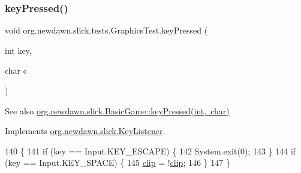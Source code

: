 \mbox{\label{classorg_1_1newdawn_1_1slick_1_1tests_1_1_graphics_test_a36789cd962301ed1cef2b20092396cfa}} 
\subsubsection{\texorpdfstring{key\+Pressed()}{keyPressed()}}
{\footnotesize\ttfamily void org.\+newdawn.\+slick.\+tests.\+Graphics\+Test.\+key\+Pressed (\begin{DoxyParamCaption}\item[{int}]{key,  }\item[{char}]{c }\end{DoxyParamCaption})\hspace{0.3cm}{\ttfamily [inline]}}

\begin{DoxySeeAlso}{See also}
\mbox{\hyperlink{classorg_1_1newdawn_1_1slick_1_1_basic_game_a4fbb3345b5abf5ddd54a99466d07f02f}{org.\+newdawn.\+slick.\+Basic\+Game\+::key\+Pressed(int, char)}} 
\end{DoxySeeAlso}


Implements \mbox{\hyperlink{interfaceorg_1_1newdawn_1_1slick_1_1_key_listener_ac0b0568a21ef486c4f51382614c196ef}{org.\+newdawn.\+slick.\+Key\+Listener}}.


\begin{DoxyCode}
140                                             \{
141         \textcolor{keywordflow}{if} (key == Input.KEY\_ESCAPE) \{
142             System.exit(0);
143         \}
144         \textcolor{keywordflow}{if} (key == Input.KEY\_SPACE) \{
145             \mbox{\hyperlink{classorg_1_1newdawn_1_1slick_1_1tests_1_1_graphics_test_a45883b25988c6ce31f644d342ab168f3}{clip}} = !\mbox{\hyperlink{classorg_1_1newdawn_1_1slick_1_1tests_1_1_graphics_test_a45883b25988c6ce31f644d342ab168f3}{clip}};
146         \}
147     \}
\end{DoxyCode}
\mbox{\label{classorg_1_1newdawn_1_1slick_1_1tests_1_1_graphics_test_a62bbd7544fd5ecc0c156f06ff518a804}} 
